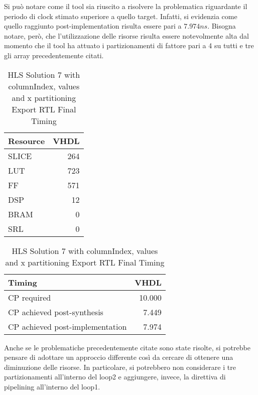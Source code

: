 Si può notare come il tool sia riuscito a risolvere la problematica riguardante il periodo di clock stimato superiore a quello target. Infatti, si evidenzia come quello raggiunto post-implementation risulta essere pari a $7.974 ns$. Bisogna notare, però, che l'utilizzazione delle risorse risulta essere notevolmente alta dal momento che il tool ha attuato i partizionamenti di fattore pari a 4 su tutti e tre gli array precedentemente citati.

\begin{table}[H]
	\centering
	\begin{minipage}[t]{0.45\linewidth}
		\centering
		\begin{tabular}{|l|r|}
			\hline
			\textbf{Resource} & \textbf{VHDL} \\
			\hline
			SLICE & 264 \\
			\hline
			LUT & 723 \\
			\hline
			FF & 571 \\
			\hline
			DSP & 12 \\
			\hline
			BRAM & 0 \\
			\hline
			SRL & 0 \\
			\hline
		\end{tabular}
		\caption{HLS Solution 7 with columnIndex, values and x partitioning Export RTL Resource Usage}
		\label{tab:hls-solution-7-columnindex-values-x-partitioning-export-rtl-resoruce-usage}
	\end{minipage}
	\hfill
	\begin{minipage}[t]{0.45\linewidth}
		\centering
		\begin{tabular}{|l|r|}
			\hline
			\textbf{Timing} & \textbf{VHDL} \\
			\hline
			CP required & 10.000 \\
			\hline
			CP achieved post-synthesis & 7.449 \\
			\hline
			CP achieved post-implementation & 7.974 \\
			\hline
		\end{tabular}
		\caption{HLS Solution 7 with columnIndex, values and x partitioning Export RTL Final Timing}
		\label{tab:hls-solution-7-columnindex-values-x-partitioning-export-rtl-final-timing}
	\end{minipage}
\end{table}

Anche se le problematiche precedentemente citate sono state risolte, si potrebbe pensare di adottare un approccio differente così da cercare di ottenere una diminuzione delle risorse. In particolare, si potrebbero non considerare i tre partizionamenti all'interno del loop2 e aggiungere, invece, la direttiva di pipelining all'interno del loop1.

